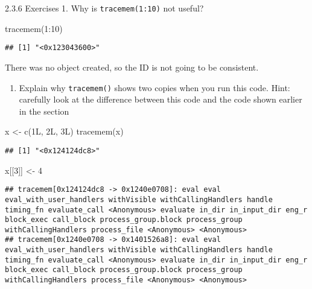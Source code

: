 \documentclass[
]{article}
\newenvironment{Shaded}{\begin{snugshade}}{\end{snugshade}}
\newcommand{\DecValTok}[1]{\textcolor[rgb]{0.00,0.00,0.81}{#1}}
\newcommand{\FunctionTok}[1]{\textcolor[rgb]{0.00,0.00,0.00}{#1}}
\newcommand{\NormalTok}[1]{#1}
\newcommand{\OtherTok}[1]{\textcolor[rgb]{0.56,0.35,0.01}{#1}}
\newcommand{\SpecialCharTok}[1]{\textcolor[rgb]{0.00,0.00,0.00}{#1}}
\providecommand{\tightlist}{%
  \setlength{\itemsep}{0pt}\setlength{\parskip}{0pt}}
\begin{document}
2.3.6 Exercises 1. Why is \texttt{tracemem(1:10)} not useful?

\begin{Shaded}
\begin{Highlighting}[]
\FunctionTok{tracemem}\NormalTok{(}\DecValTok{1}\SpecialCharTok{:}\DecValTok{10}\NormalTok{)}
\end{Highlighting}
\end{Shaded}

\begin{verbatim}
## [1] "<0x123043600>"
\end{verbatim}

There was no object created, so the ID is not going to be consistent.

\begin{enumerate}
\def\labelenumi{\arabic{enumi}.}
\setcounter{enumi}{1}
\tightlist
\item
  Explain why \texttt{tracemem()} shows two copies when you run this
  code. Hint: carefully look at the difference between this code and the
  code shown earlier in the section
\end{enumerate}

\begin{Shaded}
\begin{Highlighting}[]
\NormalTok{x }\OtherTok{\textless{}{-}} \FunctionTok{c}\NormalTok{(1L, 2L, 3L)}
\FunctionTok{tracemem}\NormalTok{(x)}
\end{Highlighting}
\end{Shaded}

\begin{verbatim}
## [1] "<0x124124dc8>"
\end{verbatim}

\begin{Shaded}
\begin{Highlighting}[]
\NormalTok{x[[}\DecValTok{3}\NormalTok{]] }\OtherTok{\textless{}{-}} \DecValTok{4}
\end{Highlighting}
\end{Shaded}

\begin{verbatim}
## tracemem[0x124124dc8 -> 0x1240e0708]: eval eval eval_with_user_handlers withVisible withCallingHandlers handle timing_fn evaluate_call <Anonymous> evaluate in_dir in_input_dir eng_r block_exec call_block process_group.block process_group withCallingHandlers process_file <Anonymous> <Anonymous> 
## tracemem[0x1240e0708 -> 0x1401526a8]: eval eval eval_with_user_handlers withVisible withCallingHandlers handle timing_fn evaluate_call <Anonymous> evaluate in_dir in_input_dir eng_r block_exec call_block process_group.block process_group withCallingHandlers process_file <Anonymous> <Anonymous>
\end{verbatim}
\end{document}
